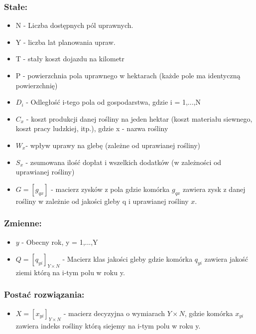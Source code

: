 \documentclass{article}
\begin{document}
	\subsubsection{Stałe:}
	\begin{itemize}
		\item N - Liczba dostępnych pól uprawnych.

		\item Y - liczba lat planowania upraw.

		\item T - stały koszt dojazdu na kilometr

		\item P - powierzchnia pola uprawnego w hektarach (każde pole ma identyczną powierzchnię)

		\item $ D_i $ -  Odległość i-tego pola od gospodarstwa, gdzie i = 1,...,N

		\item $ C_x $ - koszt produkcji danej rośliny na jeden hektar (koszt materiału siewnego, koszt pracy ludzkiej, itp.), gdzie x - nazwa rośliny

		\item $ W_x $- wpływ uprawy na glebę (zależne od uprawianej rośliny)

		\item $ S_x $ - zsumowana ilość dopłat i  wszelkich dodatków (w zależności od uprawianej rośliny)

		\item $ G = [g_{qx}] $ - macierz zysków z pola gdzie komórka  $ g_{qx} $ zawiera zysk z danej rośliny w zależnie od jakości gleby q i uprawianej rośliny $ x $.
	\end{itemize}

	\subsubsection{Zmienne:}
	\begin{itemize}
		\item $y$ - Obecny rok, y = 1,...,Y

		\item $ Q = [ q_{yi} ]_{Y \times N} $ -  Macierz klas jakości gleby gdzie komórka $ q_{yi} $ zawiera jakość ziemi którą na i-tym polu w roku y.
	\end{itemize}

	\subsubsection{Postać rozwiązania:}
	\begin{itemize}
		\item $ X = [x_{yi}]_{Y \times N} $ - macierz decyzyjna o wymiarach $ Y \times N $, gdzie komórka $ x_{yi} $ zawiera indeks rośliny którą siejemy na i-tym polu w roku y.
	\end{itemize}
\end{document}
